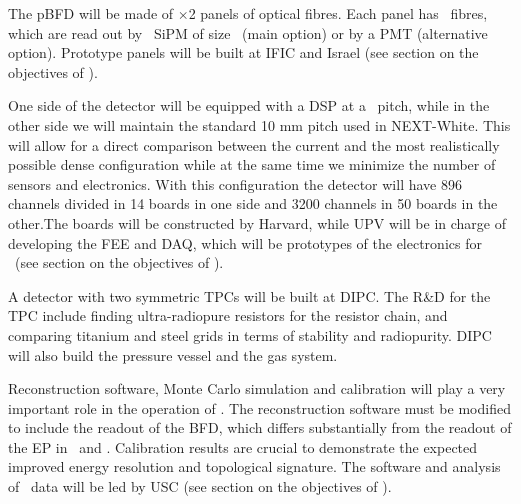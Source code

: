 
The pBFD will be made of \pBFDNP$\times$2 panels of optical fibres. Each panel has \pBFDNFPP\ fibres, which are read out by \pBFDNSIPMPP\ SiPM
of size \pBFDNSIPM\ (main option) or by a PMT (alternative option). Prototype panels will be built at IFIC and Israel (see section on the objectives of \sIFIC).


One side of the detector will be equipped with a DSP at a \pDSP\ pitch, while in the other side we will maintain the standard 10 mm pitch used in NEXT-White. This will allow for a direct comparison between the current and the most realistically possible dense configuration while at the same time we minimize the number of sensors and electronics. With this configuration the detector will have 896 channels divided in 14 boards in one side and 3200 channels in 50 boards in the other.The boards will be constructed by Harvard, while UPV will be in charge of developing the FEE and DAQ, which will be prototypes of the electronics for \NHD\ (see section on the objectives of \sUPV).




A detector with two symmetric TPCs will be built at DIPC. The R\&D for the TPC include finding ultra-radiopure resistors for the resistor chain, and comparing titanium and
steel grids in terms of stability and radiopurity. DIPC will also build the pressure vessel and the gas system. 


Reconstruction software, Monte Carlo simulation and calibration will play a very important role in the operation of \HDEMO. The reconstruction software must be modified to include the readout of the BFD, which differs substantially from the readout of the EP in \NEW\ and \Next. Calibration results are crucial to demonstrate the expected improved energy resolution and topological signature. The software and analysis of \HDEMO\ data will be led by USC  (see section on the objectives of \sUSC).



